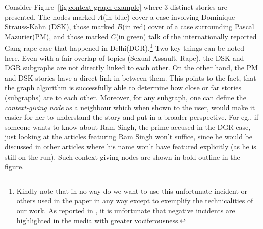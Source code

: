 Consider Figure~\ref{fig:context-graph-example} where 3 distinct stories are presented. The nodes marked $A$(in blue) cover a case involving Dominique Strauss-Kahn (DSK), 
those marked $B$(in red) cover of a case surrounding Pascal Mazurier(PM), and those marked $C$(in green) talk of the internationally reported Gang-rape case
that happened in Delhi(DGR).\footnote{Kindly note that in no way do we want to use this unfortunate incident or others used in the paper in any way except 
to exemplify the technicalities of our work. As reported in \cite{subasic-icdm:2008}, it is unfortunate that negative incidents are highlighted in the media
with greater vociferousness.} Two key things can be noted here. Even with a fair overlap of topics (Sexual Assault, Rape), the DSK and DGR subgraphs are not directly linked to each other.
On the other hand, the PM and DSK stories have a direct link in between them. This points to the fact, that the graph algorithm is successfully able
to determine how close or far stories (subgraphs) are to each other. Moreover, for any subgraph, one can define the \emph{context-giving node} as 
a neighbour which when shown to the user, would make it easier for her to understand the story and put in a broader perspective. For eg., if someone
wants to know about Ram Singh, the prime accused in the DGR case, just looking at the articles featuring Ram Singh won't suffice, since he would be
discussed in other articles where his name won't have featured explicitly (as he is still on the run). Such context-giving nodes are shown in bold outline in the figure.

